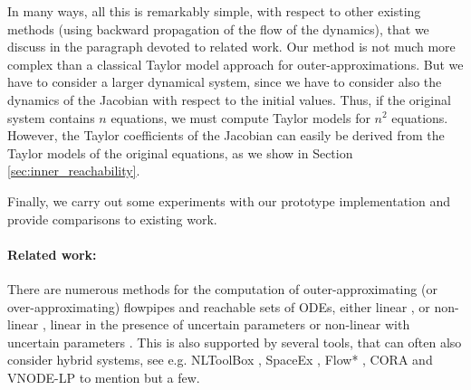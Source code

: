 \documentclass{sig-alternate-05-2015}
\begin{document}
In many ways, all this is remarkably simple, with respect to other existing methods (using backward propagation
of the flow of the dynamics), that we discuss in the paragraph devoted to related work. Our method
is not much more complex than a classical Taylor model approach for outer-approximations. 
But we have to consider a larger dynamical system, since we have to consider also the dynamics of the Jacobian with respect to the initial values.
Thus, if the original system contains $n$ equations, we must compute Taylor models for $n^2$ equations. However, the Taylor coefficients of the Jacobian 
can easily be derived from the Taylor models of the original equations, as we show in Section \ref{sec:inner_reachability}.  

Finally, we carry out some 
experiments with our prototype implementation and provide comparisons to existing work. 




\paragraph{Related work:}
\label{relatedwork}

There are numerous methods for the computation of outer-approximating (or over-approximating) flowpipes
and reachable sets of ODEs, either linear \cite{GirardLinear06}, or non-linear \cite{Nedialkov99,Dang4,Dang3}, linear
in the presence of uncertain parameters \cite{GirardHSCC2005}
or non-linear with uncertain parameters \cite{Althoff}. This is also 
supported by several tools,
that can often also consider hybrid systems, see e.g. NLToolBox \cite{NLTOOLBOX}, 
SpaceEx \cite{SPACEEX}, Flow* \cite{FLOW}, CORA \cite{Althoff2} and VNODE-LP \cite{VNODELP} to mention but a few. 
\end{document}

